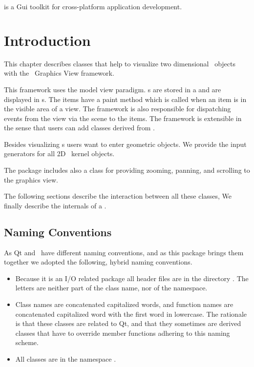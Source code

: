 

 is a
{\sc Gui} toolkit for
cross-platform application development.

\section{Introduction}

This chapter describes classes that help to visualize two dimensional \cgal\ objects
with the \qt\ Graphics View framework.

This framework uses the model view paradigm. s are stored in a 
 and are displayed in s. The items 
have a paint method which is called when an item is in the visible area of a view.
The framework is also responsible for dispatching events from the view
via the scene to the items. The framework is extensible in the sense
that users can add classes derived from .

Besides visualizing s users want to enter geometric objects.
We provide the input generators for all 2D \cgal\ kernel objects.

The package includes also a class for providing zooming, panning, and scrolling
to the graphics view.


The following sections describe the interaction between all these classes,
We finally describe the internals of a .

\subsection{Naming Conventions}

As Qt and \cgal\ have different naming conventions, and as this package
brings them together we adopted the following, hybrid naming conventions.

\begin{itemize}
\item Because it is an I/O related package all header files are in the directory
. The letters  are neither part of the class name, nor 
      of the namespace.
\item Class names are concatenated capitalized words, and function names are
      concatenated capitalized word with the first word in lowercase. The rationale is that
      these classes are related to Qt, and that they sometimes are derived
      classes that have to override member functions adhering to this naming scheme.
\item All classes are in the namespace .
\end{itemize}
 


